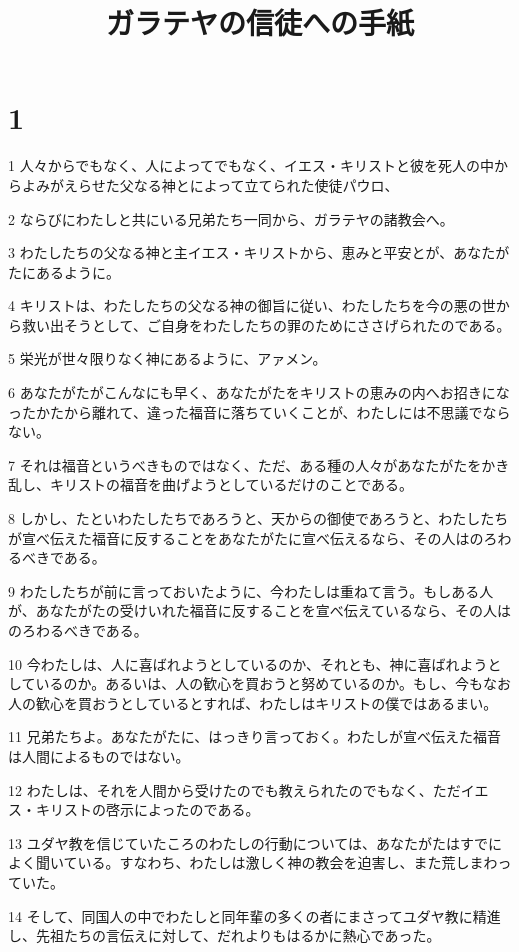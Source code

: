 

\title{ガラテヤの信徒への手紙}


\chapter{1}

\par 1 人々からでもなく、人によってでもなく、イエス・キリストと彼を死人の中からよみがえらせた父なる神とによって立てられた使徒パウロ、
\par 2 ならびにわたしと共にいる兄弟たち一同から、ガラテヤの諸教会へ。
\par 3 わたしたちの父なる神と主イエス・キリストから、恵みと平安とが、あなたがたにあるように。
\par 4 キリストは、わたしたちの父なる神の御旨に従い、わたしたちを今の悪の世から救い出そうとして、ご自身をわたしたちの罪のためにささげられたのである。
\par 5 栄光が世々限りなく神にあるように、アァメン。
\par 6 あなたがたがこんなにも早く、あなたがたをキリストの恵みの内へお招きになったかたから離れて、違った福音に落ちていくことが、わたしには不思議でならない。
\par 7 それは福音というべきものではなく、ただ、ある種の人々があなたがたをかき乱し、キリストの福音を曲げようとしているだけのことである。
\par 8 しかし、たといわたしたちであろうと、天からの御使であろうと、わたしたちが宣べ伝えた福音に反することをあなたがたに宣べ伝えるなら、その人はのろわるべきである。
\par 9 わたしたちが前に言っておいたように、今わたしは重ねて言う。もしある人が、あなたがたの受けいれた福音に反することを宣べ伝えているなら、その人はのろわるべきである。
\par 10 今わたしは、人に喜ばれようとしているのか、それとも、神に喜ばれようとしているのか。あるいは、人の歓心を買おうと努めているのか。もし、今もなお人の歓心を買おうとしているとすれば、わたしはキリストの僕ではあるまい。
\par 11 兄弟たちよ。あなたがたに、はっきり言っておく。わたしが宣べ伝えた福音は人間によるものではない。
\par 12 わたしは、それを人間から受けたのでも教えられたのでもなく、ただイエス・キリストの啓示によったのである。
\par 13 ユダヤ教を信じていたころのわたしの行動については、あなたがたはすでによく聞いている。すなわち、わたしは激しく神の教会を迫害し、また荒しまわっていた。
\par 14 そして、同国人の中でわたしと同年輩の多くの者にまさってユダヤ教に精進し、先祖たちの言伝えに対して、だれよりもはるかに熱心であった。
